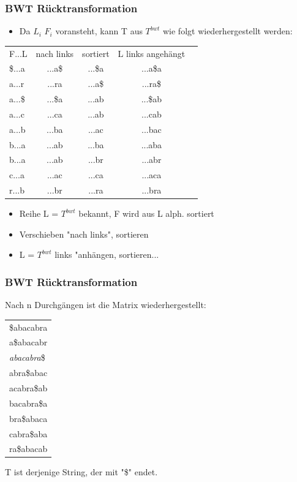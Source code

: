 \documentclass{beamer}
\begin{document}
\begin{frame}
\frametitle{BWT R\"ucktransformation}
\begin{itemize}
\item Da $L_i$ $F_i$ voransteht, kann T aus $T^{bwt}$ wie folgt wiederhergestellt werden:
\end{itemize}
\begin{tabular}{l c cc r}
F...L & nach links &sortiert& L links angeh\"angt\\
\$...a &...a\$ &...\$a&...a\$a\\
a...r &...ra &...a\$&...ra\$\\
a...\$ &...\$a &...ab&...\$ab\\
a...c &...ca &...ab&...cab\\
a...b &...ba &...ac&...bac\\
b...a &...ab &...ba&...aba\\
b...a &...ab &...br&...abr\\
c...a &...ac &...ca&...aca\\
r...b &...br &...ra&...bra\\
\end{tabular}
\begin{itemize}
\item Reihe L = $T^{bwt}$ bekannt, F wird aus L alph. sortiert
\item Verschieben "nach links", sortieren
\item L = $T^{bwt}$ links "anh\"angen, sortieren...
\end{itemize}
\end{frame}
\begin{frame}
\frametitle{BWT R\"ucktransformation}
Nach n Durchg\"angen ist die Matrix wiederhergestellt:\newline
\begin{tabular}{l}
\$abacabra \\
a\$abacabr \\
\color{red}\textit{abacabra}\$ \\
abra\$abac \\
acabra\$ab \\
bacabra\$a \\
bra\$abaca \\
cabra\$aba \\
ra\$abacab \\
\end{tabular}
\newline T ist derjenige String, der mit "\$" endet.
\end{frame}
\end{document}
